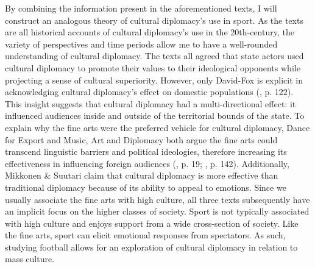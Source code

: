 By combining the information present in the aforementioned texts, I will construct an analogous theory of cultural diplomacy’s use in sport. As the texts are all historical accounts of cultural diplomacy’s use in the 20th-century, the variety of perspectives and time periods allow me to have a well-rounded understanding of cultural diplomacy. The texts all agreed that state actors used cultural diplomacy to promote their values to their ideological opponents while projecting a sense of cultural superiority. However, only David-Fox is explicit in acknowledging cultural diplomacy’s effect on domestic populations (\citeyear{david-fox2012}, p. 122). This insight suggests that cultural diplomacy had a multi-directional effect: it influenced audiences inside and outside of the territorial bounds of the state. To explain why the fine arts were the preferred vehicle for cultural diplomacy, Dance for Export and Music, Art and Diplomacy both argue the fine arts could transcend linguistic barriers and political ideologies, therefore increasing its effectiveness in influencing foreign audiences (\cite{prevots2012}, p. 19; \cite{gonçalves2016}, p. 142). Additionally, Mikkonen \& Suutari claim that cultural diplomacy is more effective than traditional diplomacy because of its ability to appeal to emotions. Since we usually associate the fine arts with high culture, all three texts subsequently have an implicit focus on the higher classes of society. Sport is not typically associated with high culture and enjoys support from a wide cross-section of society. Like the fine arts, sport can elicit emotional responses from spectators. As such, studying football allows for an exploration of cultural diplomacy in relation to mass culture. 
